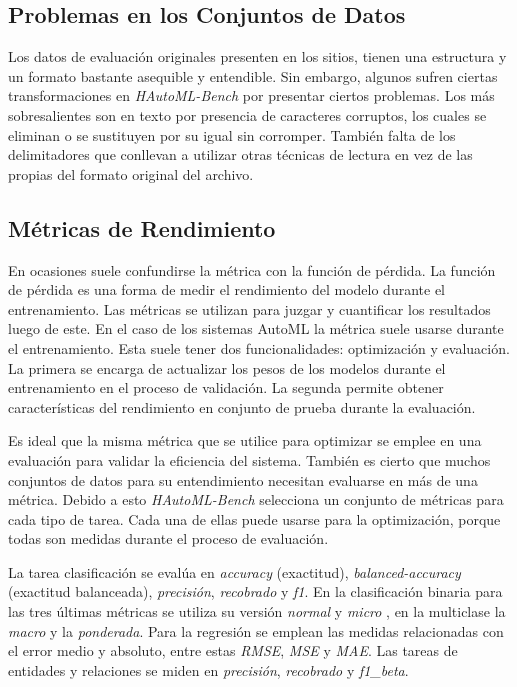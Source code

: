 \subsection{Problemas en los Conjuntos de Datos}\label{subsection:dataproblems}

Los datos de evaluación originales presenten en los sitios, tienen una estructura y un formato bastante asequible y entendible. Sin embargo, algunos sufren ciertas 
transformaciones en \textit{HAutoML-Bench} por presentar ciertos problemas. Los más sobresalientes son en texto por presencia de caracteres corruptos, los cuales
se eliminan o se sustituyen por su igual sin corromper. También falta de los delimitadores que conllevan a utilizar otras técnicas de lectura en vez de las propias 
del formato original del archivo.

\subsection{Métricas de Rendimiento}\label{subsection:metrics}

En ocasiones suele confundirse la métrica con la función de pérdida. La función de pérdida es una forma de medir el rendimiento del modelo durante el 
entrenamiento. Las métricas se utilizan para juzgar y cuantificar los resultados luego de este. En el caso de los sistemas AutoML la métrica suele usarse 
durante el entrenamiento. Esta suele tener dos funcionalidades: optimización y evaluación. La primera se encarga de actualizar los pesos de los modelos durante el 
entrenamiento en el proceso de validación. La segunda permite obtener características del rendimiento en conjunto de prueba durante la evaluación.

Es ideal que la misma métrica que se utilice para optimizar se emplee en una evaluación para validar la eficiencia del sistema. También es cierto que muchos conjuntos 
de datos para su entendimiento necesitan evaluarse en más de una métrica. Debido a esto \textit{HAutoML-Bench} selecciona un conjunto de métricas para cada 
tipo de tarea. Cada una de ellas puede usarse para la optimización, porque todas son medidas durante el proceso de evaluación.

La tarea clasificación se evalúa en \textit{accuracy} (exactitud), \textit{balanced-accuracy} (exactitud balanceada), \textit{precisión}, \textit{recobrado} y 
\textit{f1}. En la clasificación binaria para las tres últimas métricas se utiliza su versión \textit{normal} y \textit{micro} , en la 
multiclase la \textit{macro} y la \textit{ponderada}. Para la regresión se emplean las medidas relacionadas con el error medio y 
absoluto, entre estas \textit{RMSE}, \textit{MSE} y \textit{MAE}. 
Las tareas de entidades y relaciones se miden en \textit{precisión}, \textit{recobrado} y \textit{f1\_beta}.


